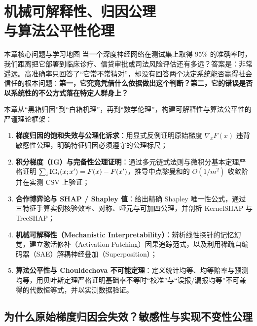 \chapter[可解释性、归因公理与算法公平性]{机械可解释性、归因公理\\与算法公平性伦理}\label{ch:interp-fairness}


\begin{chapIntro}{本章核心问题与学习地图}
当一个深度神经网络在测试集上取得 $95\%$ 的准确率时，我们距离把它部署到临床诊疗、信贷审批或司法风险评估还有多远？答案是：非常遥远。高准确率只回答了“它常不常猜对”，却没有回答两个决定系统能否赢得社会信任的根本问题：\textbf{第一，它究竟凭借什么依据做出这个判断？第二，它的错误是否以系统性的不公方式落在特定人群身上？}

本章从“黑箱归因”到“白箱机理”，再到“数学伦理”，构建可解释性与算法公平性的严谨理论框架：
\begin{enumerate}
  \item \textbf{梯度归因的饱和失效与公理化诉求}：用显式反例证明原始梯度 $\nabla_x F(x)$ 违背敏感性公理，明确特征归因必须遵守的公理标尺；
  \item \textbf{积分梯度（IG）与完备性公理证明}：通过多元链式法则与微积分基本定理严格证明 $\sum_i \operatorname{IG}_i(x; x') = F(x) - F(x')$，推导中点黎曼和的 $O(1/m^2)$ 收敛阶并在实测 CSV 上验证；
  \item \textbf{合作博弈论与 SHAP / Shapley 值}：给出精确 Shapley 唯一性公式，通过三特征手算实例核验效率、对称、哑元与可加四公理，并剖析 KernelSHAP 与 TreeSHAP；
  \item \textbf{机械可解释性（Mechanistic Interpretability）}：辨析线性探针的记忆幻觉，建立激活修补（Activation Patching）因果追踪范式，以及利用稀疏自编码器（SAE）解耦神经叠加（Superposition）；
  \item \textbf{算法公平性与 Chouldechova 不可能定理}：定义统计均等、均等赔率与预测均等，用贝叶斯定理严格证明基础率不等时“校准”与“误报/漏报均等”不可兼得的代数恒等式，并以实测数据验证。
\end{enumerate}
\end{chapIntro}

\section{为什么原始梯度归因会失效？敏感性与实现不变性公理}

